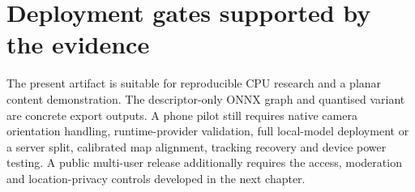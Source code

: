 \section{Deployment gates supported by the evidence}
The present artifact is suitable for reproducible CPU research and a planar content demonstration. The descriptor-only ONNX graph and quantised variant are concrete export outputs. A phone pilot still requires native camera orientation handling, runtime-provider validation, full local-model deployment or a server split, calibrated map alignment, tracking recovery and device power testing. A public multi-user release additionally requires the access, moderation and location-privacy controls developed in the next chapter.
